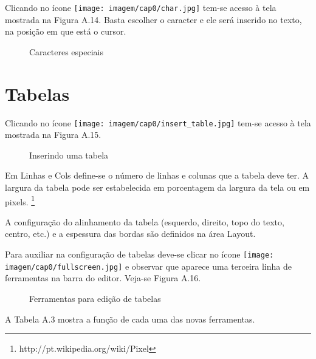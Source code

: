 Clicando no ícone \texttt{[image: imagem/cap0/char.jpg]} tem-se acesso à tela mostrada na Figura A.14. Basta escolher o caracter e ele será inserido no texto, na posição em que está o cursor.

\begin{figure}
 \begin{center}
  \caption{Caracteres especiais}
 \end{center}
\end{figure}

\section{Tabelas}


Clicando no ícone \texttt{[image: imagem/cap0/insert\_table.jpg]} tem-se acesso à tela mostrada na Figura A.15.

\begin{figure}
 \begin{center}
  \caption{Inserindo uma tabela}
 \end{center}
\end{figure}


Em Linhas e Cols define-se o número de linhas e colunas que a tabela deve ter. A largura da tabela pode ser estabelecida em porcentagem da largura da tela ou em pixels. \footnote{http://pt.wikipedia.org/wiki/Pixel}

A configuração do alinhamento da tabela (esquerdo, direito, topo do texto, centro, etc.) e a espessura das bordas são definidos na área Layout.

Para auxiliar na configuração de tabelas deve-se clicar no ícone \texttt{[image: imagem/cap0/fullscreen.jpg]} e observar que aparece uma terceira linha de ferramentas na barra do editor. Veja-se Figura A.16.

\begin{figure}
 \begin{center}
  \caption{Ferramentas para edição de tabelas}
 \end{center}
\end{figure}

A Tabela A.3 mostra a função de cada uma das novas ferramentas.

